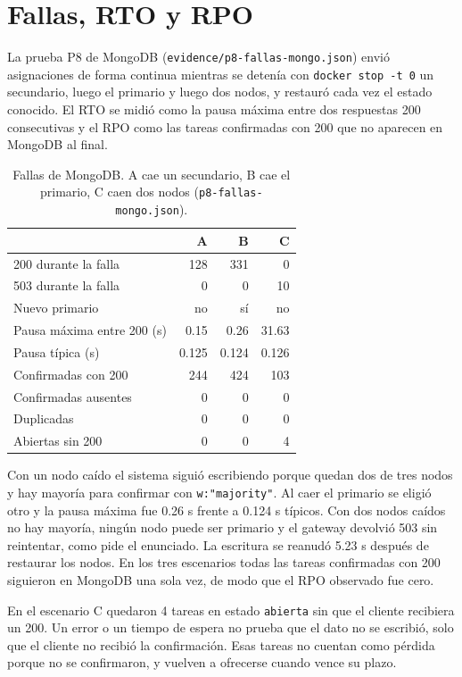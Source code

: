 \documentclass[conference]{IEEEtran}
\begin{document}
\section{Fallas, RTO y RPO}

La prueba P8 de MongoDB (\texttt{evidence/p8-fallas-mongo.json}) envió asignaciones de forma continua mientras se detenía con \texttt{docker stop -t 0} un secundario, luego el primario y luego dos nodos, y restauró cada vez el estado conocido. El RTO se midió como la pausa máxima entre dos respuestas 200 consecutivas y el RPO como las tareas confirmadas con 200 que no aparecen en MongoDB al final.

\begin{table}[!t]
\caption{Fallas de MongoDB. A cae un secundario, B cae el primario, C caen dos nodos (\texttt{p8-fallas-mongo.json}).}
\label{tab:p8}
\centering\footnotesize
\begin{tabular}{@{}l r r r@{}}
\toprule
& \textbf{A} & \textbf{B} & \textbf{C} \\
\midrule
200 durante la falla & 128 & 331 & 0 \\
503 durante la falla & 0 & 0 & 10 \\
Nuevo primario & no & sí & no \\
Pausa máxima entre 200 (s) & 0.15 & 0.26 & 31.63 \\
Pausa típica (s) & 0.125 & 0.124 & 0.126 \\
Confirmadas con 200 & 244 & 424 & 103 \\
Confirmadas ausentes & 0 & 0 & 0 \\
Duplicadas & 0 & 0 & 0 \\
Abiertas sin 200 & 0 & 0 & 4 \\
\bottomrule
\end{tabular}
\end{table}

Con un nodo caído el sistema siguió escribiendo porque quedan dos de tres nodos y hay mayoría para confirmar con \texttt{w:"majority"}. Al caer el primario se eligió otro y la pausa máxima fue 0.26 s frente a 0.124 s típicos. Con dos nodos caídos no hay mayoría, ningún nodo puede ser primario y el gateway devolvió 503 sin reintentar, como pide el enunciado. La escritura se reanudó 5.23 s después de restaurar los nodos. En los tres escenarios todas las tareas confirmadas con 200 siguieron en MongoDB una sola vez, de modo que el RPO observado fue cero.

En el escenario C quedaron 4 tareas en estado \texttt{abierta} sin que el cliente recibiera un 200. Un error o un tiempo de espera no prueba que el dato no se escribió, solo que el cliente no recibió la confirmación. Esas tareas no cuentan como pérdida porque no se confirmaron, y vuelven a ofrecerse cuando vence su plazo.
\end{document}
